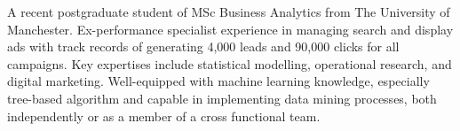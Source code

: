 

\begin{cvparagraph}

A recent postgraduate student of MSc Business Analytics from The University of Manchester.
Ex-performance specialist experience in managing search and display ads with track records of generating 4,000 leads and 90,000 clicks for all campaigns.
Key expertises include statistical modelling, operational research, and digital marketing. 
Well-equipped with machine learning knowledge, especially tree-based algorithm and capable in implementing data mining processes, both independently or as a member of a cross functional team. 
\end{cvparagraph}


